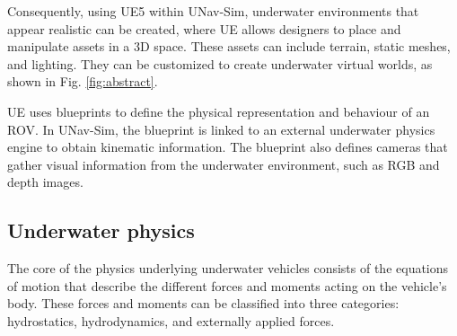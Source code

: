 Consequently, using \ac{UE5} within UNav-Sim, underwater environments that appear realistic can be created, where \ac{UE} allows designers to place and manipulate assets in a 3D space. 
These assets can include terrain, static meshes, and lighting. They can be customized to create underwater virtual worlds, as shown in Fig. \ref{fig:abstract}. 

UE uses blueprints to define the physical representation and behaviour of an \ac{ROV}. In UNav-Sim, the blueprint is linked to an external underwater physics engine to obtain kinematic information. The blueprint also defines cameras that gather visual information from the underwater environment, such as RGB and depth images. 



\subsection{Underwater physics}

The core of the physics underlying underwater vehicles consists of the equations of motion that describe the different forces and moments acting on the vehicle's body. These forces and moments can be classified into three categories: hydrostatics, hydrodynamics, and externally applied forces.




